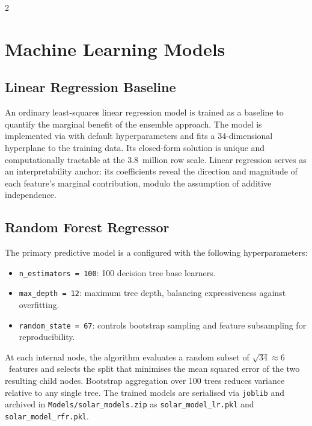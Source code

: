 \documentclass[11pt]{article}
\begin{document}
\newpage
\begin{multicols}{2}

\section{Machine Learning Models}

\subsection{Linear Regression Baseline}

An ordinary least-squares linear regression model is trained as a baseline to
quantify the marginal benefit of the ensemble approach. The model is
implemented via  with default
hyperparameters and fits a 34-dimensional hyperplane to the training data.
Its closed-form solution is unique and computationally tractable at the
3.8~million row scale. Linear regression serves as an interpretability anchor:
its coefficients reveal the direction and magnitude of each feature's marginal
contribution, modulo the assumption of additive independence.

\subsection{Random Forest Regressor}

The primary predictive model is a
 configured with the following
hyperparameters:

\begin{itemize}
  \item \texttt{n\_estimators = 100}: 100 decision tree base learners.
  \item \texttt{max\_depth = 12}: maximum tree depth, balancing expressiveness
        against overfitting.
  \item \texttt{random\_state = 67}: controls bootstrap sampling and feature
        subsampling for reproducibility.
\end{itemize}

At each internal node, the algorithm evaluates a random subset of
\(\sqrt{34} \approx 6\)~features and selects the split that minimises the
mean squared error of the two resulting child nodes. Bootstrap aggregation
over 100 trees reduces variance relative to any single tree. The trained
models are serialised via \texttt{joblib} and archived in
\texttt{Models/solar\_models.zip} as \texttt{solar\_model\_lr.pkl} and
\texttt{solar\_model\_rfr.pkl}.


\end{multicols}
\end{document}

